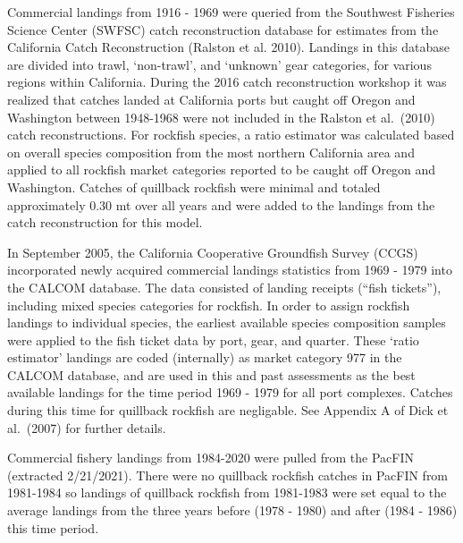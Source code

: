 \documentclass[11pt,
  english,
  a4paper,
]{article}
\begin{document}
Commercial landings from 1916 - 1969 were queried from the Southwest Fisheries Science Center (SWFSC) catch reconstruction database for estimates from the California Catch Reconstruction {(Ralston et al. 2010)\leavevmode\tagmcend\tagstructend}. Landings in this database are divided into trawl, `non-trawl', and `unknown' gear categories, for various regions within California. During the 2016 catch reconstruction workshop it was realized that catches landed at California ports but caught off Oregon and Washington between 1948-1968 were not included in the Ralston et al.~{(2010)\leavevmode\tagmcend\tagstructend} catch reconstructions. For rockfish species, a ratio estimator was calculated based on overall species composition from the most northern California area and applied to all rockfish market categories reported to be caught off Oregon and Washington. Catches of quillback rockfish were minimal and totaled approximately 0.30 mt over all years and were added to the landings from the catch reconstruction for this model.

\leavevmode\tagmcend\tagstructend\par


In September 2005, the California Cooperative Groundfish Survey (CCGS) incorporated newly acquired commercial landings statistics from 1969 - 1979 into the CALCOM database. The data consisted of landing receipts (``fish tickets''), including mixed species categories for rockfish. In order to assign rockfish landings to individual species, the earliest available species composition samples were applied to the fish ticket data by port, gear, and quarter. These `ratio estimator' landings are coded (internally) as market category 977 in the CALCOM database, and are used in this and past assessments as the best available landings for the time period 1969 - 1979 for all port complexes. Catches during this time for quillback rockfish are negligable. See Appendix A of Dick et al.~{(2007)\leavevmode\tagmcend\tagstructend} for further details.

\leavevmode\tagmcend\tagstructend\par


Commercial fishery landings from 1984-2020 were pulled from the PacFIN (extracted 2/21/2021). There were no quillback rockfish catches in PacFIN from 1981-1984 so landings of quillback rockfish from 1981-1983 were set equal to the average landings from the three years before (1978 - 1980) and after (1984 - 1986) this time period.
\end{document}
